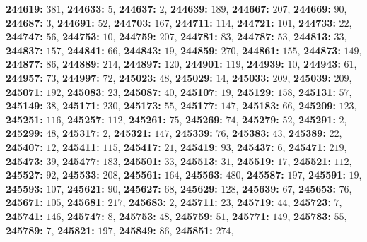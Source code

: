 \textsf{\bfseries 244619:} $381$, \textsf{\bfseries 244633:} $5$, \textsf{\bfseries 244637:} $2$, \textsf{\bfseries 244639:} $189$, \textsf{\bfseries 244667:} $207$, \textsf{\bfseries 244669:} $90$, \textsf{\bfseries 244687:} $3$, \textsf{\bfseries 244691:} $52$, \textsf{\bfseries 244703:} $167$, \textsf{\bfseries 244711:} $114$, \textsf{\bfseries 244721:} $101$, \textsf{\bfseries 244733:} $22$, \textsf{\bfseries 244747:} $56$, \textsf{\bfseries 244753:} $10$, \textsf{\bfseries 244759:} $207$, \textsf{\bfseries 244781:} $83$, \textsf{\bfseries 244787:} $53$, \textsf{\bfseries 244813:} $33$, \textsf{\bfseries 244837:} $157$, \textsf{\bfseries 244841:} $66$, \textsf{\bfseries 244843:} $19$, \textsf{\bfseries 244859:} $270$, \textsf{\bfseries 244861:} $155$, \textsf{\bfseries 244873:} $149$, \textsf{\bfseries 244877:} $86$, \textsf{\bfseries 244889:} $214$, \textsf{\bfseries 244897:} $120$, \textsf{\bfseries 244901:} $119$, \textsf{\bfseries 244939:} $10$, \textsf{\bfseries 244943:} $61$, \textsf{\bfseries 244957:} $73$, \textsf{\bfseries 244997:} $72$, \textsf{\bfseries 245023:} $48$, \textsf{\bfseries 245029:} $14$, \textsf{\bfseries 245033:} $209$, \textsf{\bfseries 245039:} $209$, \textsf{\bfseries 245071:} $192$, \textsf{\bfseries 245083:} $23$, \textsf{\bfseries 245087:} $40$, \textsf{\bfseries 245107:} $19$, \textsf{\bfseries 245129:} $158$, \textsf{\bfseries 245131:} $57$, \textsf{\bfseries 245149:} $38$, \textsf{\bfseries 245171:} $230$, \textsf{\bfseries 245173:} $55$, \textsf{\bfseries 245177:} $147$, \textsf{\bfseries 245183:} $66$, \textsf{\bfseries 245209:} $123$, \textsf{\bfseries 245251:} $116$, \textsf{\bfseries 245257:} $112$, \textsf{\bfseries 245261:} $75$, \textsf{\bfseries 245269:} $74$, \textsf{\bfseries 245279:} $52$, \textsf{\bfseries 245291:} $2$, \textsf{\bfseries 245299:} $48$, \textsf{\bfseries 245317:} $2$, \textsf{\bfseries 245321:} $147$, \textsf{\bfseries 245339:} $76$, \textsf{\bfseries 245383:} $43$, \textsf{\bfseries 245389:} $22$, \textsf{\bfseries 245407:} $12$, \textsf{\bfseries 245411:} $115$, \textsf{\bfseries 245417:} $21$, \textsf{\bfseries 245419:} $93$, \textsf{\bfseries 245437:} $6$, \textsf{\bfseries 245471:} $219$, \textsf{\bfseries 245473:} $39$, \textsf{\bfseries 245477:} $183$, \textsf{\bfseries 245501:} $33$, \textsf{\bfseries 245513:} $31$, \textsf{\bfseries 245519:} $17$, \textsf{\bfseries 245521:} $112$, \textsf{\bfseries 245527:} $92$, \textsf{\bfseries 245533:} $208$, \textsf{\bfseries 245561:} $164$, \textsf{\bfseries 245563:} $480$, \textsf{\bfseries 245587:} $197$, \textsf{\bfseries 245591:} $19$, \textsf{\bfseries 245593:} $107$, \textsf{\bfseries 245621:} $90$, \textsf{\bfseries 245627:} $68$, \textsf{\bfseries 245629:} $128$, \textsf{\bfseries 245639:} $67$, \textsf{\bfseries 245653:} $76$, \textsf{\bfseries 245671:} $105$, \textsf{\bfseries 245681:} $217$, \textsf{\bfseries 245683:} $2$, \textsf{\bfseries 245711:} $23$, \textsf{\bfseries 245719:} $44$, \textsf{\bfseries 245723:} $7$, \textsf{\bfseries 245741:} $146$, \textsf{\bfseries 245747:} $8$, \textsf{\bfseries 245753:} $48$, \textsf{\bfseries 245759:} $51$, \textsf{\bfseries 245771:} $149$, \textsf{\bfseries 245783:} $55$, \textsf{\bfseries 245789:} $7$, \textsf{\bfseries 245821:} $197$, \textsf{\bfseries 245849:} $86$, \textsf{\bfseries 245851:} $274$, 
